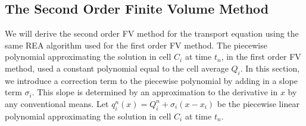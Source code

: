 \subsection{The Second Order Finite Volume Method}
We will derive the second order FV method for the transport equation using the same REA algorithm used for the first order FV method. The piecewise polynomial approximating the solution in cell $C_i$ at time $t_n$, in the first order FV method, used a constant polynomial equal to the cell average $Q_i$. In this section, we introduce a correction term to the piecewise polynomial by adding in a slope term $\sigma_i$. This slope is determined by an approximation to the derivative in $x$ by any conventional means. Let $q_i^n(x) = Q_i^n + \sigma_i (x - x_i)$ be the piecewise linear polynomial approximating the solution in cell $C_i$ at time $t_{n}$.
%
%
%
%
%
